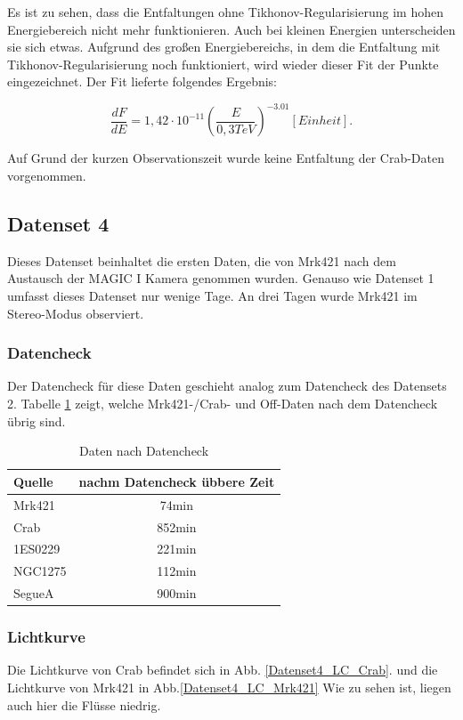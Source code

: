 Es ist zu sehen, dass die Entfaltungen ohne Tikhonov-Regularisierung im hohen Energiebereich nicht mehr funktionieren.
Auch bei kleinen Energien unterscheiden sie sich etwas.
Aufgrund des großen Energiebereichs, in dem die Entfaltung mit Tikhonov-Regularisierung noch funktioniert, wird wieder dieser Fit der Punkte eingezeichnet.
Der Fit lieferte folgendes Ergebnis:

\begin{equation}
 \frac{dF}{dE}=1,42 \cdot 10^{-11}\left( \frac{E}{0,3 \si{TeV}} \right)^{-3.01} [Einheit].
\end{equation}

Auf Grund der kurzen Observationszeit wurde keine Entfaltung der Crab-Daten vorgenommen.

\FloatBarrier

\subsection{Datenset 4}
\label{subsec:Datenset_4}
Dieses Datenset beinhaltet die ersten Daten, die von Mrk421 nach dem Austausch der MAGIC I Kamera genommen wurden. 
Genauso wie Datenset 1 umfasst dieses Datenset nur wenige Tage. 
An drei Tagen wurde Mrk421 im Stereo-Modus observiert. 

\subsubsection{Datencheck}
Der Datencheck für diese Daten geschieht analog zum Datencheck des Datensets 2. 
Tabelle \ref{tab:Datenset4} zeigt, welche Mrk421-/Crab- und Off-Daten nach dem Datencheck übrig sind.

\begin{table}[!h]
\centering
\caption{Daten nach Datencheck}
\label{tab:Datenset4}
\begin{tabular}{lc}
  \toprule
  Quelle & nachm Datencheck übbere Zeit\\
  \midrule
  \midrule
  Mrk421 & 74min\\
  \midrule
  Crab & 852min\\
  \midrule
  1ES0229 & 221min \\
  NGC1275 & 112min \\
  SegueA & 900min  \\
  \bottomrule
  \bottomrule
\end{tabular}
\end{table}

\subsubsection{Lichtkurve}
Die Lichtkurve von Crab befindet sich in Abb. \ref{Datenset4_LC_Crab}.
und die Lichtkurve von Mrk421 in Abb.\ref{Datenset4_LC_Mrk421} 
Wie zu sehen ist, liegen auch hier die Flüsse niedrig.


